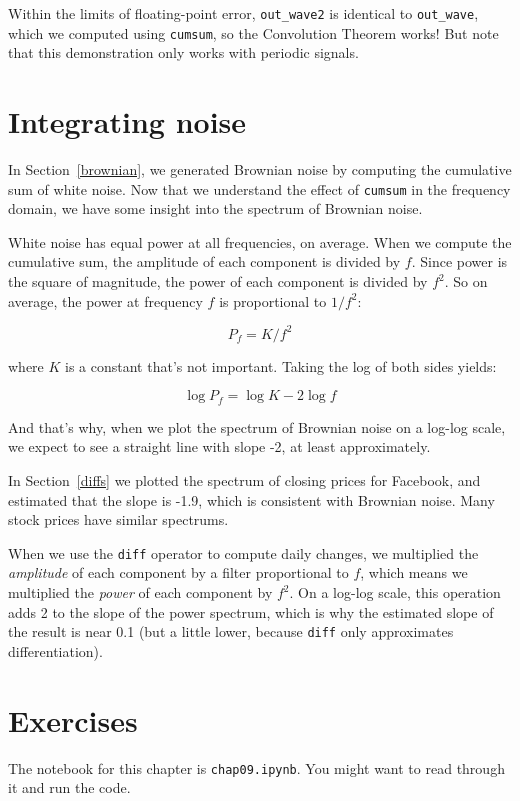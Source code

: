 \documentclass[12pt]{book} \usepackage[width=5.5in,height=8.5in, hmarginratio=3:2,vmarginratio=1:1]{geometry}
\begin{document}
Within the limits of floating-point error, \verb"out_wave2" is identical to \verb"out_wave", which we computed using {\tt cumsum}, so the Convolution Theorem works! But note that this demonstration only works with periodic signals. 

\section{Integrating noise} 

In Section~\ref{brownian}, we generated Brownian noise by computing the cumulative sum of white noise. Now that we understand the effect of {\tt cumsum} in the frequency domain, we have some insight into the spectrum of Brownian noise. 

White noise has equal power at all frequencies, on average. When we compute the cumulative sum, the amplitude of each component is divided by $f$. Since power is the square of magnitude, the power of each component is divided by $f^2$. So on average, the power at frequency $f$ is proportional to $1 / f^2$: 

%
\[ P_f = K / f^2 \] 

%
where $K$ is a constant that's not important. Taking the log of both sides yields: 

%
\[ \log P_f = \log K - 2 \log f \] 

%
And that's why, when we plot the spectrum of Brownian noise on a log-log scale, we expect to see a straight line with slope -2, at least approximately. 

In Section~\ref{diffs} we plotted the spectrum of closing prices for Facebook, and estimated that the slope is -1.9, which is consistent with Brownian noise. Many stock prices have similar spectrums. 

When we use the {\tt diff} operator to compute daily changes, we multiplied the {\em amplitude} of each component by a filter proportional to $f$, which means we multiplied the {\em power} of each component by $f^2$. On a log-log scale, this operation adds 2 to the slope of the power spectrum, which is why the estimated slope of the result is near 0.1 (but a little lower, because {\tt diff} only approximates differentiation). 

\section{Exercises} 

The notebook for this chapter is {\tt chap09.ipynb}. You might want to read through it and run the code. 
\end{document}

